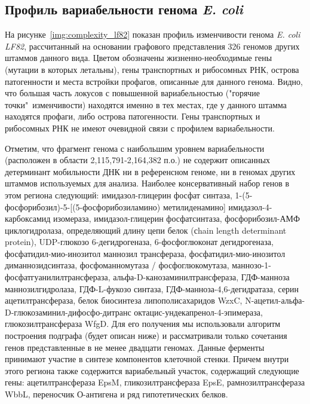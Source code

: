 \subsection{Профиль вариабельности генома \textit{E. coli}}
На рисунке~\ref{img:complexity_lf82} показан профиль изменчивости генома \textit{E. coli LF82}, рассчитанный на основании графового представления 326 геномов других штаммов данного вида. Цветом обозначены жизненно-необходимые гены (мутации в которых летальны), гены транспортных и рибосомных РНК, острова патогенности и места встройки профагов, описанные для данного генома. Видно, что большая часть локусов с повышенной вариабельностью ("горячие точки"\ изменчивости) находятся именно в тех местах, где у данного штамма находятся профаги, либо острова патогенности. Гены транспортных и рибосомных РНК не имеют очевидной связи с профилем вариабельности. 

Отметим, что фрагмент генома с наибольшим уровнем вариабельности (расположен в области 2,115,791-2,164,382 п.о.) не содержит описанных детерминант мобильности ДНК ни в референсном геноме, ни в геномах других штаммов используемых для анализа. Наиболее консервативный набор генов в этом региона следующий: имидазол-глицерин фосфат синтаза, 1-(5-фосфорибозил)-5-[(5-фосфорибозиламино) метилиденамино] имидазол-4-карбоксамид изомераза, имидазол-глицерин фосфатсинтаза, фосфорибозил-АМФ циклогидролаза, определяющий длину цепи белок (сhain length determinant protein), UDP-глюкозо 6-дегидрогеназа, 6-фосфоглюконат дегидрогеназа, фосфатидил-мио-инозитол маннозил трансфераза, фосфатидил-мио-инозитол диманнозидсинтаза, фосфоманномутаза / фосфоглюкомутаза, маннозо-1-фосфатгуанилилтрансфераза, альфа-D-канозаминилтрансфераза, ГДФ-манноза маннозилгидролаза, ГДФ-L-фукозо синтаза, ГДФ-манноза-4,6-дегидратаза, серин ацетилтрансфераза, белок биосинтеза липополисахаридов WzxC, N-ацетил-альфа-D-глюкозаминил-дифосфо-дитранс октацис-ундекапренол-4-эпимераза, глюкозилтрансфераза WfgD. Для его получения мы использовали алгоритм построения подграфа (будет описан ниже) и рассматривали только сочетания генов представленные в не менее двадцати геномах. Данные ферменты принимают участие в синтезе компонентов клеточной стенки. Причем внутри этого региона также содержится вариабельный участок, содержащий следующие гены: ацетилтрансфераза EpsM, гликозилтрансфераза EpsE, рамнозилтрансфераза WbbL, переносчик О-антигена и ряд гипотетических белков. 

